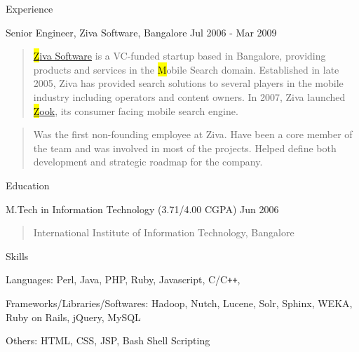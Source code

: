 \documentclass{resume}
\author{Siddhartha Reddy Kothakapu}
\begin{document}
 \maketitle


\begin{category}{Experience}{}

    \item {\topic Senior Engineer,} Ziva Software, Bangalore
        {\period Jul 2006 - Mar 2009}
        \begin{quote}
            \href{http://www.zook.in/}{{\hl Ziva Software}} is a VC-funded
            startup based in Bangalore, providing products and services in the
            {\hl Mobile Search} domain.  Established in late 2005, Ziva has
            provided search solutions to several players in the mobile industry
            including operators and content owners. In 2007, Ziva launched
            \href{http://www.zook.in/}{{\hl Zook}}, its consumer facing mobile
            search engine.
        \end{quote}
        \begin{quote}
            Was the first non-founding employee at Ziva. Have been a core
            member of the team and was involved in most of the projects. Helped
            define both development and strategic roadmap for the company.
        \end{quote}

\end{category}


\begin{category}{Education}{}

    \item {\topic M.Tech in Information Technology}
        {\footnotesize(3.71/4.00 CGPA)}
        {\period Jun 2006}
        \begin{quote}
            International Institute of Information Technology, Bangalore
        \end{quote}

\end{category}


\begin{category}{Skills}{}

    \item {\topic Languages:} Perl, Java, PHP, Ruby, Javascript, C/C{\tt ++},

    \item {\topic Frameworks/Libraries/Softwares:} Hadoop, Nutch, Lucene, Solr,
        Sphinx, WEKA, Ruby on Rails, jQuery, MySQL

    \item {\topic Others:} HTML, CSS, JSP, Bash Shell Scripting

\end{category}
\end{document}
